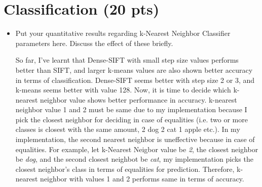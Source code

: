 \documentclass[12pt]{article}
\begin{document}
\section{Classification (20 pts)}
    \begin{itemize}
        \item Put your quantitative results regarding k-Nearest Neighbor Classifier parameters here. Discuss the effect of these briefly.
        
		So far, I've learnt that Dense-SIFT with small step size values performs better than SIFT, and larger k-means values are also shown better accuracy in terms of classification. Dense-SIFT seems better with step size 2 or 3, and k-means seems better with value 128. Now, it is time to decide which k-nearest neighbor value shows better performance in accuracy. k-nearest neighbor value 1 and 2 must be same due to my implementation because I pick the closest neighbor for deciding in case of equalities (i.e. two or more classes is closest with the same amount, 2 dog 2 cat 1 apple etc.). In my implementation, the second nearest neighbor is uneffective because in case of equalities. For example, let k-Nearest Neigbor value be \textit{2}, the closest neighbor be \textit{dog}, and the second closest neighbot be \textit{cat}, my implementation picks the closest neighbor's class in terms of equalities for prediction. Therefore, k-nearest neighbor with values 1 and 2 performs same in terms of accuracy.
		

\end{itemize}
\end{document}
